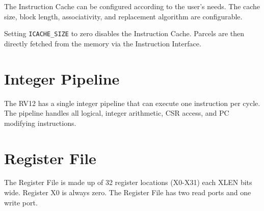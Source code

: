 The Instruction Cache can be configured according to the user's needs.
The cache size, block length, associativity, and replacement algorithm
are configurable.

Setting \texttt{ICACHE\_SIZE} to zero disables the Instruction Cache. Parcels are
then directly fetched from the memory via the Instruction Interface.

\section{Integer Pipeline}\label{integer-pipeline}

The RV12 has a single integer pipeline that can execute one instruction per cycle.
The pipeline handles all logical, integer arithmetic, CSR access, and PC
modifying instructions.


\section{Register File}\label{register-file}

The Register File is made up of 32 register locations (X0-X31) each XLEN
bits wide. Register X0 is always zero. The Register File has two read
ports and one write port.
